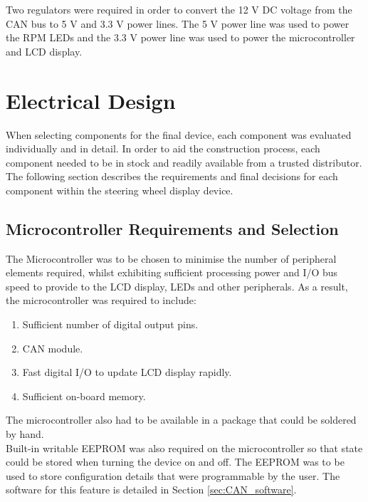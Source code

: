 \documentclass[a4paper,12pt]{article}
\begin{document}
Two regulators were required in order to convert the 12 V DC voltage from the CAN bus to 5 V and 3.3 V power lines. The 5 V power line was used to power the RPM LEDs and the 3.3 V power line was used to power the microcontroller and LCD display. \\


\newpage
\section{Electrical Design}
\label{sec:electrical_design}

When selecting components for the final device, each component was evaluated individually and in detail. In order to aid the construction process, each component needed to be in stock and readily available from a trusted distributor. The following section describes the requirements and final decisions for each component within the steering wheel display device. \\

\subsection{Microcontroller Requirements and Selection}
\label{sec:microcontroller}

The Microcontroller was to be chosen to minimise the number of peripheral elements required, whilst exhibiting sufficient processing power and I/O bus speed to provide to the LCD display, LEDs and other peripherals. As a result, the microcontroller was required to include:

\begin{enumerate}
  \item Sufficient number of digital output pins.
  \item CAN module.
  \item Fast digital I/O to update LCD display rapidly.
  \item Sufficient on-board memory.
\end{enumerate}

The microcontroller also had to be available in a package that could be soldered by hand. \\

Built-in writable EEPROM was also required on the microcontroller so that state could be stored when turning the device on and off. The EEPROM was to be used to store configuration details that were programmable by the user. The software for this feature is detailed in Section \ref{sec:CAN_software}. \\
\end{document}
